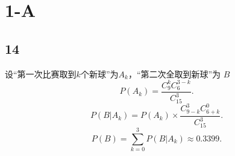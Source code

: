 \def\lecturer{LiManMan}
\def\noter{THF}
\def\className{Statistics}
\def\term{III-B}



\section{1-A}%
\label{sec:1-A}
\subsection{14}%
\label{sub:14}
设“第一次比赛取到$k$个新球”为$A_k$，“第二次全取到新球”为 $B$ 
 \[
    P\left( A_k \right) =\frac{C_{9}^{k}C_{6}^{3-k}}{C_{15}^{3}}
.\] 
\[
    P\left( B|A_k \right) =P\left( A_k \right) \times \frac{C_{9-k}^{3}C_{6+k}^{0}}{C_{15}^{3}}
.\] 
\[
    P\left( B \right) =\sum_{k=0}^{3} P\left( B|A_k \right) \approx 0.3399
.\] 

